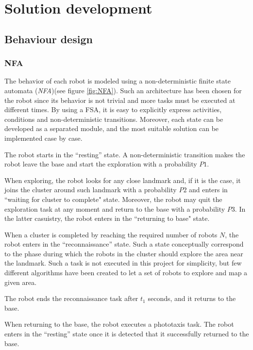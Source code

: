 \chapter{Solution development}

\section{Behaviour design}

\subsection{NFA}

The behavior of each robot is modeled using a non-deterministic finite state automata (\textit{NFA})(see figure \ref{fig:NFA}). Such an architecture has been chosen for the robot since its behavior is not trivial and more tasks must be executed at different times. By using a FSA, it is easy to explicitly express activities, conditions and non-deterministic transitions. Moreover, each state can be developed as a separated module, and the most suitable solution can be implemented case by case.

\noindent
The robot starts in the ``resting'' state. A non-deterministic transition makes the robot leave the base and start the exploration with a probability $P1$. 

\noindent
When exploring, the robot looks for any close landmark and, if it is the case, it joins the cluster around such landmark with a probability $P2$ and enters in ``waiting for cluster to complete" state. Moreover, the robot may quit the exploration task at any moment and return to the base with a probability $P3$. In the latter casuistry, the robot enters in the ``returning to base" state.

\noindent
When a cluster is completed by reaching the required number of robots $N$, the robot enters in the ``reconnaissance'' state. Such a state conceptually correspond to the phase during which the robots in the cluster should explore the area near the landmark. Such a task is not executed in this project for simplicity, but few different algorithms have been created to let a set of robots to explore and map a given area.

\noindent
The robot ends the reconnaissance task after $t_1$ seconds, and it returns to the base.

\noindent
When returning to the base, the robot executes a phototaxis task. The robot enters in the ``resting'' state once it is detected that it successfully returned to the base. 

